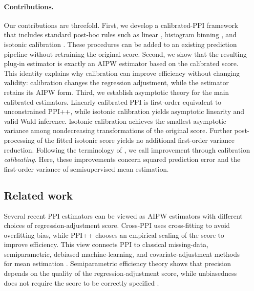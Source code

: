 \documentclass{article}
\theoremstyle{plain}
\theoremstyle{definition}
\newcommand{\1}{\mathbf{1}}
\begin{document}
\paragraph{Contributions.}
Our contributions are threefold. First, we develop a calibrated-PPI framework
that includes standard post-hoc rules such as linear
\citep{mincer1969evaluation,leng2021calibration}, histogram binning
\citep{zadrozny2001obtaining,gupta2021distribution}, and isotonic calibration
\citep{zadrozny2002transforming,niculescu2005predicting}. These procedures can
be added to an existing prediction pipeline without retraining the original
score. Second, we show that the resulting plug-in estimator is exactly an AIPW
estimator based on the calibrated score. This identity explains why calibration
can improve efficiency without changing validity: calibration changes the
regression adjustment, while the estimator retains its AIPW form. Third, we
establish asymptotic theory for the main calibrated estimators. Linearly
calibrated PPI is first-order equivalent to unconstrained PPI++, while isotonic
calibration yields asymptotic linearity and valid Wald inference. Isotonic
calibration achieves the smallest asymptotic variance among nondecreasing
transformations of the original score. Further post-processing of the fitted
isotonic score yields no additional first-order variance reduction. Following
the terminology of \citet{foster2023calibeating}, we call improvement through
calibration \emph{calibeating}. Here, these improvements concern squared
prediction error and the first-order variance of semisupervised mean estimation.

\subsection{Related work}

Several recent PPI estimators can be viewed as AIPW estimators with
different choices of regression-adjustment score. Cross-PPI uses cross-fitting
to avoid overfitting bias, while PPI++ chooses an empirical scaling of the score
to improve efficiency. This view connects PPI to classical missing-data,
semiparametric, debiased machine-learning, and covariate-adjustment methods for
mean estimation
\citep{robins1994estimation,vanderlaanunified,van2006targeted,
vanderLaanRose2011,DoubleML,schuler2022increasing,hojbjerre2025powering}.
Semiparametric efficiency theory shows that precision depends on the quality of
the regression-adjustment score, while unbiasedness does not require the score
to be correctly specified
\citep{robins1994estimation,bang2005doubly,robins1995semiparametric,
xu2025unified}.
\end{document}
